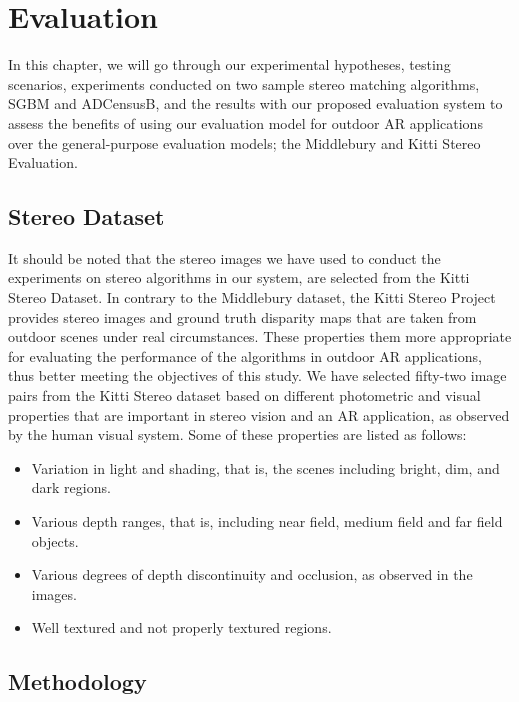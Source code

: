 \chapter{Evaluation}
\label{chap:Evaluation}
\renewcommand{\arraystretch}{0.5}

In this chapter, we will go through our experimental hypotheses, testing scenarios, experiments conducted on two sample 
stereo matching algorithms, SGBM and ADCensusB, and the results with our
proposed evaluation system to assess the benefits of using our evaluation model for outdoor AR applications over the general-purpose evaluation models; 
the Middlebury and Kitti Stereo Evaluation.

\section{Stereo Dataset}
It should be noted that the stereo images we have used to conduct the experiments on stereo algorithms in our system,
are selected from the Kitti Stereo Dataset.
In contrary to the Middlebury dataset, the Kitti Stereo Project provides stereo images and ground truth disparity maps
that are taken from outdoor scenes under real circumstances. These properties them more appropriate 
for evaluating the performance of the algorithms in outdoor AR applications, thus better meeting the objectives of this study.
We have selected fifty-two image pairs from the Kitti Stereo dataset based on different photometric and visual properties that are important
in stereo vision and an AR application, as observed by the human visual system. Some 
of these properties are listed as follows:
\begin{itemize}
\item Variation in light and shading, that is, the scenes including bright, dim, and dark regions.
\item Various depth ranges, that is, including near field, medium field and far field objects. 
\item Various degrees of depth discontinuity and occlusion, as observed in the images.
\item Well textured and not properly textured regions.
\end{itemize}

\section{Methodology}

